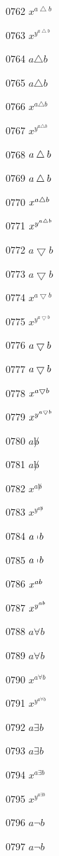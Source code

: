 \documentclass{article}
\begin{document}
0762 $x^{a\bigtriangleup b}$\par
0763 $x^{y^{a\bigtriangleup b}}$\par
0764 $a\triangle b$\par
0765 $\displaystyle a\triangle b$\par
0766 $x^{a\triangle b}$\par
0767 $x^{y^{a\triangle b}}$\par
0768 $a\varbigtriangleup b$\par
0769 $\displaystyle a\varbigtriangleup b$\par
0770 $x^{a\varbigtriangleup b}$\par
0771 $x^{y^{a\varbigtriangleup b}}$\par
0772 $a\bigtriangledown b$\par
0773 $\displaystyle a\bigtriangledown b$\par
0774 $x^{a\bigtriangledown b}$\par
0775 $x^{y^{a\bigtriangledown b}}$\par
0776 $a\varbigtriangledown b$\par
0777 $\displaystyle a\varbigtriangledown b$\par
0778 $x^{a\varbigtriangledown b}$\par
0779 $x^{y^{a\varbigtriangledown b}}$\par
0780 $a\not b$\par
0781 $\displaystyle a\not b$\par
0782 $x^{a\not b}$\par
0783 $x^{y^{a\not b}}$\par
0784 $a\mapstochar b$\par
0785 $\displaystyle a\mapstochar b$\par
0786 $x^{a\mapstochar b}$\par
0787 $x^{y^{a\mapstochar b}}$\par
0788 $a\forall b$\par
0789 $\displaystyle a\forall b$\par
0790 $x^{a\forall b}$\par
0791 $x^{y^{a\forall b}}$\par
0792 $a\exists b$\par
0793 $\displaystyle a\exists b$\par
0794 $x^{a\exists b}$\par
0795 $x^{y^{a\exists b}}$\par
0796 $a\lnot b$\par
0797 $\displaystyle a\lnot b$\par
\end{document}
